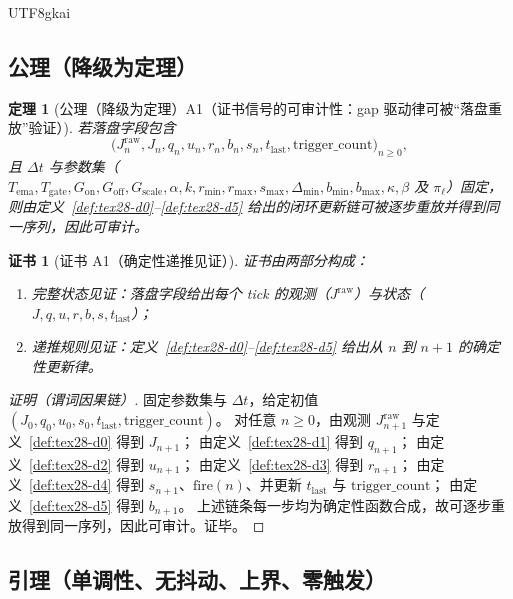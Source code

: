 \documentclass[12pt]{article}
\newtheorem{theorem}{定理}[section]
\newtheorem{Certificate}{证书}[section]
\begin{document}
\begin{CJK*}{UTF8}{gkai}
\subsection{公理（降级为定理）}
\label{subsec:tex28-axioms}

\begin{theorem}[公理（降级为定理）A1（证书信号的可审计性：gap 驱动律可被“落盘重放”验证）]
\label{thm:tex28-a1}
若落盘字段包含
\[
  \bigl(J^{\mathrm{raw}}_n,J_n,q_n,u_n,r_n,b_n,s_n,t_{\mathrm{last}},\mathrm{trigger\_count}\bigr)_{n\ge 0},
\]
且 $\Delta t$ 与参数集（$T_{\mathrm{ema}},T_{\mathrm{gate}},G_{\mathrm{on}},G_{\mathrm{off}},G_{\mathrm{scale}},\alpha,k,
  r_{\min},r_{\max},s_{\max},\Delta_{\min},b_{\min},b_{\max},\kappa,\beta$ 及 $\pi_\ell$）固定，
则由定义~\ref{def:tex28-d0}--\ref{def:tex28-d5} 给出的闭环更新链可被逐步重放并得到同一序列，因此可审计。
\end{theorem}

\begin{Certificate}[证书 A1（确定性递推见证）]
\label{cert:tex28-a1}
证书由两部分构成：
\begin{enumerate}
  \item 完整状态见证：落盘字段给出每个 tick 的观测（$J^{\mathrm{raw}}$）与状态（$J,q,u,r,b,s,t_{\mathrm{last}}$）；
  \item 递推规则见证：定义~\ref{def:tex28-d0}--\ref{def:tex28-d5} 给出从 $n$ 到 $n+1$ 的确定性更新律。
\end{enumerate}
\end{Certificate}

\begin{proof}[证明（谓词因果链）]
固定参数集与 $\Delta t$，给定初值 $(J_0,q_0,u_0,s_0,t_{\mathrm{last}},\mathrm{trigger\_count})$。
对任意 $n\ge 0$，由观测 $J^{\mathrm{raw}}_{n+1}$ 与定义~\ref{def:tex28-d0} 得到 $J_{n+1}$；
由定义~\ref{def:tex28-d1} 得到 $q_{n+1}$；
由定义~\ref{def:tex28-d2} 得到 $u_{n+1}$；
由定义~\ref{def:tex28-d3} 得到 $r_{n+1}$；
由定义~\ref{def:tex28-d4} 得到 $s_{n+1}$、$\mathrm{fire}(n)$、并更新 $t_{\mathrm{last}}$ 与 $\mathrm{trigger\_count}$；
由定义~\ref{def:tex28-d5} 得到 $b_{n+1}$。
上述链条每一步均为确定性函数合成，故可逐步重放得到同一序列，因此可审计。证毕。
\end{proof}

\subsection{引理（单调性、无抖动、上界、零触发）}
\label{subsec:tex28-lemmas}


\end{CJK*}
\end{document}
